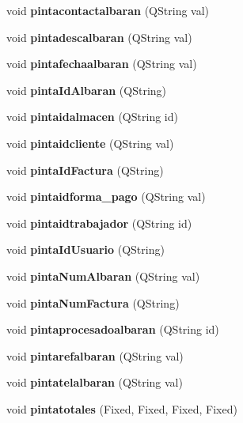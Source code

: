 \begin{CompactItemize}
\item 
void {\bf pintacontactalbaran} (QString val)\label{classAlbaranClienteView_a9}

\item 
void {\bf pintadescalbaran} (QString val)\label{classAlbaranClienteView_a10}

\item 
void {\bf pintafechaalbaran} (QString val)\label{classAlbaranClienteView_a11}

\item 
void {\bf pinta\-Id\-Albaran} (QString)\label{classAlbaranClienteView_a12}

\item 
void {\bf pintaidalmacen} (QString id)\label{classAlbaranClienteView_a13}

\item 
void {\bf pintaidcliente} (QString val)\label{classAlbaranClienteView_a14}

\item 
void {\bf pinta\-Id\-Factura} (QString)\label{classAlbaranClienteView_a15}

\item 
void {\bf pintaidforma\_\-pago} (QString val)\label{classAlbaranClienteView_a16}

\item 
void {\bf pintaidtrabajador} (QString id)\label{classAlbaranClienteView_a17}

\item 
void {\bf pinta\-Id\-Usuario} (QString)\label{classAlbaranClienteView_a18}

\item 
void {\bf pinta\-Num\-Albaran} (QString val)\label{classAlbaranClienteView_a19}

\item 
void {\bf pinta\-Num\-Factura} (QString)\label{classAlbaranClienteView_a20}

\item 
void {\bf pintaprocesadoalbaran} (QString id)\label{classAlbaranClienteView_a21}

\item 
void {\bf pintarefalbaran} (QString val)\label{classAlbaranClienteView_a22}

\item 
void {\bf pintatelalbaran} (QString val)\label{classAlbaranClienteView_a23}

\item 
void {\bf pintatotales} (Fixed, Fixed, Fixed, Fixed)\label{classAlbaranClienteView_a24}

\end{CompactItemize}


